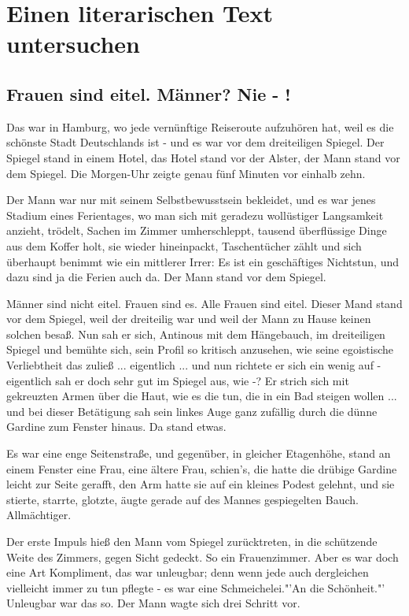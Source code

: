 \documentclass[12pt,a4paper]{scrartcl}
\begin{document}
\section{Einen literarischen Text untersuchen}
\modulolinenumbers[5]
%
\begin{linenumbers}
\subsection*{Frauen sind eitel. Männer? Nie - !} 
Das war in Hamburg, wo jede vernünftige Reiseroute aufzuhören hat, weil es die schönste Stadt Deutschlands ist - und es war vor dem dreiteiligen Spiegel. Der Spiegel stand in einem Hotel, das Hotel stand vor der Alster, der Mann stand vor dem Spiegel. Die Morgen-Uhr zeigte genau fünf Minuten vor einhalb zehn.

Der Mann war nur mit seinem Selbstbewusstsein bekleidet, und es war jenes Stadium eines Ferientages, wo man sich mit geradezu wollüstiger Langsamkeit anzieht, trödelt, Sachen im Zimmer umherschleppt, tausend überflüssige Dinge aus dem Koffer holt, sie wieder hineinpackt, Taschentücher zählt und sich überhaupt benimmt wie ein mittlerer Irrer: Es ist ein geschäftiges Nichtstun, und dazu sind ja die Ferien auch da. Der Mann stand vor dem Spiegel.

Männer sind nicht eitel. Frauen sind es. Alle Frauen sind eitel. Dieser Mand stand vor dem Spiegel, weil der dreiteilig war und weil der Mann zu Hause keinen solchen besaß. Nun sah er sich, Antinous mit dem Hängebauch, im dreiteiligen Spiegel und bemühte sich, sein Profil so kritisch anzusehen, wie seine egoistische Verliebtheit das zuließ ... eigentlich ... und nun richtete er sich ein wenig auf - eigentlich sah er doch sehr gut im Spiegel aus, wie -? Er strich sich mit gekreuzten Armen über die Haut, wie es die tun, die in ein Bad steigen wollen ... und bei dieser Betätigung sah sein linkes Auge ganz zufällig durch die dünne Gardine zum Fenster hinaus. Da stand etwas.

Es war eine enge Seitenstraße, und gegenüber, in gleicher Etagenhöhe, stand an einem Fenster eine Frau, eine ältere Frau, schien's, die hatte die drübige Gardine leicht zur Seite gerafft, den Arm hatte sie auf ein kleines Podest gelehnt, und sie stierte, starrte, glotzte, äugte gerade auf des Mannes gespiegelten Bauch. Allmächtiger.

Der erste Impuls hieß den Mann vom Spiegel zurücktreten, in die schützende Weite des Zimmers, gegen Sicht gedeckt. So ein Frauenzimmer. Aber es war doch eine Art Kompliment, das war unleugbar; denn wenn jede auch dergleichen vielleicht immer zu tun pflegte - es war eine Schmeichelei."'An die Schönheit."' Unleugbar war das so. Der Mann wagte sich drei Schritt vor.


\end{linenumbers}
\end{document}
